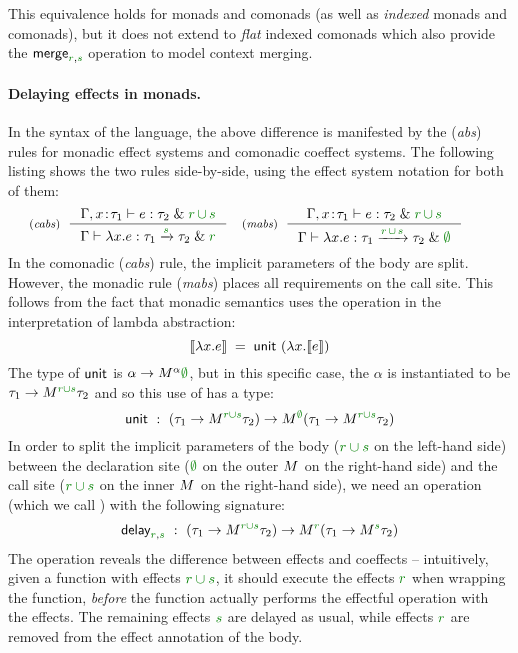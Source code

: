 \noindent
This equivalence holds for monads and comonads (as well as \emph{indexed} monads
and comonads), but it does not extend to \emph{flat} indexed comonads which also provide
the $\ident{merge}_{\cclrd{r}, \cclrd{s}}$ operation to model context merging.

\paragraph{Delaying effects in monads.} 
In the syntax of the language, the above difference is manifested by the (\emph{abs}) rules for 
monadic effect systems and comonadic coeffect systems. The following listing shows the two rules 
side-by-side, using the effect system notation for both of them:
%
\begin{equation*}
\tyrule{cabs}
  { \Gamma, x\!:\!\tau_1 \vdash e : \tau_2 \;\&\; \cclrd{r}\,\cclrd{\cup}\,\cclrd{s} }
  { \Gamma \vdash \lambda x.e : \tau_1 \xrightarrow{\cclrd{s}} \tau_2 \;\&\; \cclrd{r}}
\quad
\tyrule{mabs}
  { \Gamma, x\!:\!\tau_1 \vdash e : \tau_2 \;\&\; \cclrd{r}\,\cclrd{\cup}\,\cclrd{s}}
  { \Gamma \vdash \lambda x.e : \tau_1 \xrightarrow{\cclrd{r}\,\cclrd{\cup}\,\cclrd{s}} \tau_2 \;\&\; \cclrd{\emptyset} }
\qquad
\end{equation*}
%
In the comonadic (\emph{cabs}) rule, the implicit parameters of the body are split. However,
the monadic rule (\emph{mabs}) places all requirements on the call site. This follows from the
fact that monadic semantics uses the  operation in the interpretation of lambda abstraction:
%
\begin{equation*}
\sem{\lambda x.e} \;=\; \ident{unit}~(\lambda x. \sem{e})
\end{equation*}
%
The type of $\textnormal{\sffamily unit}$ is $\alpha\rightarrow\mtyp{\alpha}{\cclrd{\emptyset}}$, but in this specific
case, the $\alpha$ is instantiated to be $\tau_1\rightarrow\mtyp{\cclrd{r \cup s}}{\tau_2}$ and so this
use of  has a type:
%
\begin{equation*}
\ident{unit}~:~(\tau_1\rightarrow\mtyp{\cclrd{r \cup s}}{\tau_2}) \rightarrow \mtyp{\cclrd{\emptyset}}(\tau_1\rightarrow\mtyp{\cclrd{r \cup s}}{\tau_2})
\end{equation*}
%
In order to split the implicit parameters of the body ($\cclrd{r \cup s}$ on the left-hand side) between 
the declaration site ($\cclrd{\emptyset}$ on the outer $\mtyp{}$ on the right-hand side) and the 
call site ($\cclrd{r \cup s}$ on the inner $\mtyp{}$ on the right-hand side), we need an operation
(which we call ) with the following signature:
%
\begin{equation*}
\ident{delay}_{\cclrd{r}, \cclrd{s}}~:~(\tau_1\rightarrow\mtyp{\cclrd{r \cup s}}{\tau_2}) \rightarrow \mtyp{\cclrd{r}}(\tau_1\rightarrow\mtyp{\cclrd{s}}{\tau_2})
\end{equation*}
%
The operation reveals the difference between effects and coeffects -- intuitively, given a function
with effects $\cclrd{r \cup s}$, it should execute the effects $\cclrd{r}$ when wrapping the 
function, \emph{before} the function actually performs the effectful operation with the effects.
The remaining effects $\cclrd{s}$ are delayed as usual, while effects $\cclrd{r}$ are removed
from the effect annotation of the body.

